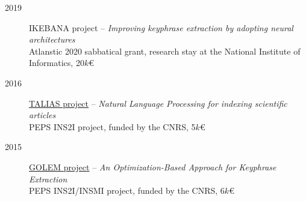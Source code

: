 \begin{description}
    
    \item[2019] IKEBANA project -- 
                \emph{Improving keyphrase extraction by adopting neural architectures} \\
                Atlanstic 2020 sabbatical grant, research stay at the National Institute of Informatics, 20$k$€

    \item[2016] \href{http://boudinfl.github.io/talias/}{TALIAS project} -- 
                \emph{Natural Language Processing for indexing scientific articles} \\
                PEPS INS2I project, funded by the CNRS, 5$k$€

    \item[2015] \href{http://boudinfl.github.io/golem/}{GOLEM project} -- 
                \emph{An Optimization-Based Approach for Keyphrase Extraction} \\
                PEPS INS2I/INSMI project, funded by the CNRS, 6$k$€
                
\end{description}
